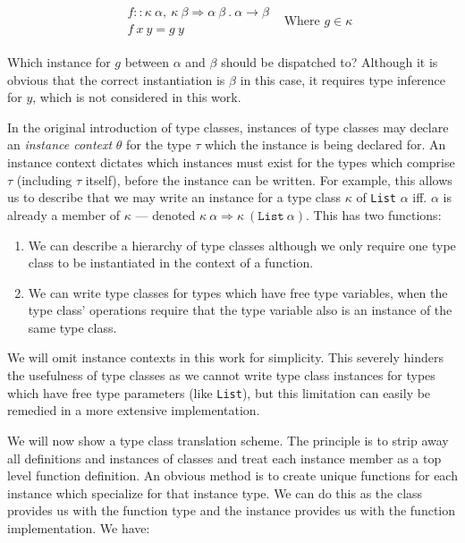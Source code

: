 \begin{align*}
  &\begin{array}{l}
  f :: \kappa~\alpha,~\kappa~\beta \Rightarrow \alpha~\beta~.~\alpha \rightarrow \beta \\
  f~x~y = g~y
  \end{array}
  &\text{Where $g \in \kappa$}
\end{align*}

Which instance for $g$ between $\alpha$ and $\beta$ should be dispatched to?
Although it is obvious that the correct instantiation is $\beta$ in this case,
it requires type inference for $y$, which is not considered in this work.

In the original introduction of type classes, instances of type classes may
declare an \emph{instance context} $\theta$ for the type $\tau$ which the
instance is being declared for. An instance context dictates which instances
must exist for the types which comprise $\tau$ (including $\tau$ itself),
before the instance can be written. For example, this allows us to describe
that we may write an instance for a type class $\kappa$ of \texttt{List}
$\alpha$ iff. $\alpha$ is already a member of $\kappa$ --- denoted
$\kappa~\alpha \Rightarrow \kappa~(\texttt{List}~\alpha)$.  This has two
functions:

\begin{enumerate}

  \item We can describe a hierarchy of type classes although we only require
    one type class to be instantiated in the context of a function.

  \item We can write type classes for types which have free type variables,
    when the type class' operations require that the type variable also is an
    instance of the same type class.

\end{enumerate}

We will omit instance contexts in this work for simplicity. This severely
hinders the usefulness of type classes as we cannot write type class instances
for types which have free type parameters (like \texttt{List}), but this
limitation can easily be remedied in a more extensive implementation.

We will now show a type class translation scheme. The principle is to strip
away all definitions and instances of classes and treat each instance member
as a top level function definition. An obvious method is to create unique
functions for each instance which specialize for that instance type. We can do
this as the class provides us with the function type and the instance provides
us with the function implementation. We have:

